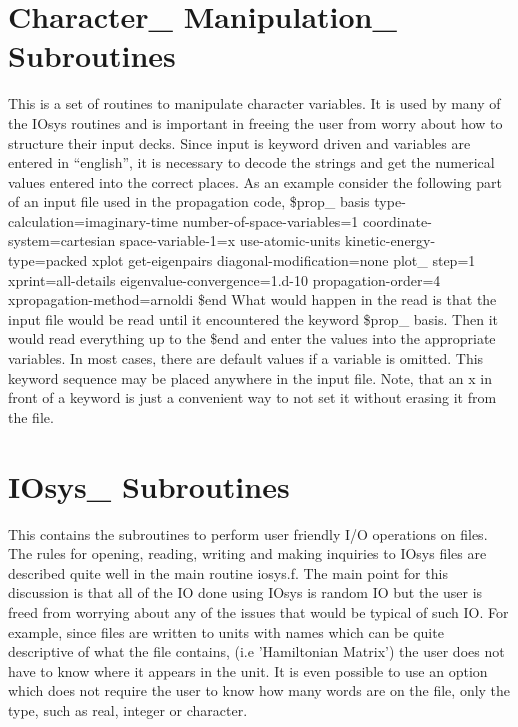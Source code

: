 \documentclass[onecolumn,letterpaper]{report}
\begin{document}
\section{Character\_ Manipulation\_ Subroutines}
This is a set of routines to manipulate character variables.  It is used by many
of the IOsys routines and is important in freeing the user from worry about
how to structure their input decks.  Since input is keyword driven 
and variables are entered in ``english'', it is necessary to decode the strings and
get the numerical values entered into the correct places.  As an example consider
the following part of an input file used in the propagation code,
\newline
\$prop\_ basis
\newline
                 type-calculation=imaginary-time
\newline
 number-of-space-variables=1 coordinate-system=cartesian
\newline
 space-variable-1=x use-atomic-units kinetic-energy-type=packed
\newline
 xplot get-eigenpairs diagonal-modification=none
\newline
 plot\_ step=1 xprint=all-details eigenvalue-convergence=1.d-10
\newline
 propagation-order=4 xpropagation-method=arnoldi
\newline
\$end
\newline
What would happen in the read is that the input file would be read until it encountered the
keyword {\$prop\_ basis}.  Then it would read everything up to the \$end and enter the values
into the appropriate variables.  In most cases, there are default values if a variable
is omitted.  This keyword sequence may be placed anywhere in the input file.   Note, that an x
in front of a keyword is just a convenient way to not set it without erasing it from the file.
\section{IOsys\_ Subroutines}
This contains the subroutines to perform user friendly I/O operations on files.
The rules for opening, reading, writing and making inquiries to IOsys files are described 
quite well in the main routine iosys.f.  The main point for this discussion
is that all of the IO done using IOsys is random IO but the user is freed from worrying about
any of the issues that would be typical of such IO.  For example, since files are written to units
with names which can be quite descriptive of what the file contains, (i.e 'Hamiltonian Matrix') the
user does not have to know where it appears in the unit.  It is even possible to use an option
which does not require the user to know how many words are on the file, only the type, such as
real, integer or character.
\end{document}
